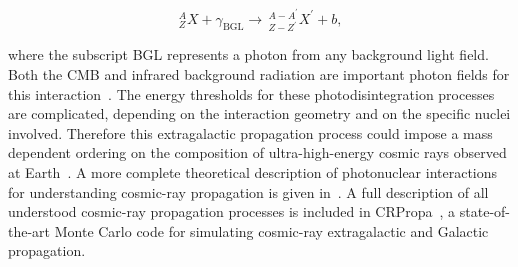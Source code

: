 \begin{equation}
  \,_{Z}^{A}X + \gamma_{\text{BGL}} \rightarrow \,_{Z - Z^{\prime}}^{A - A^{\prime}}X^{\prime} + b, \label{eq:cmb_photodisintegration}
\end{equation}

\noindent
where the subscript BGL represents a photon from any background light field.
Both the CMB and infrared background radiation are important photon fields for this interaction~\cite{puget_apj1976_photodisintegration, stecker_apj1999_photodisintegration}.
The energy thresholds for these photodisintegration processes are complicated, depending on the interaction geometry and on the specific nuclei involved.
Therefore this extragalactic propagation process could impose a mass dependent ordering on the composition of ultra-high-energy cosmic rays observed at Earth~\cite{tom_book}.
A more complete theoretical description of photonuclear interactions for understanding cosmic-ray propagation is given in~\cite{rachen_phdthesis}.
A full description of all understood cosmic-ray propagation processes is included in CRPropa~\cite{rafa_crpropa}, a state-of-the-art Monte Carlo code for simulating cosmic-ray extragalactic and Galactic propagation.










